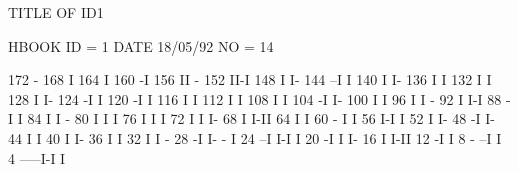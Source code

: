 \begin{Listing}
 TITLE OF ID1                                                                    
 
 HBOOK     ID =         1                                        DATE  18/05/92              NO =    14
 
      172                                    -
      168                                    I
      164                                    I
      160                                   -I
      156                                   II -
      152                                   II-I
      148                                   I  I-
      144                                 --I   I
      140                                 I     I-
      136                                 I      I
      132                                 I      I
      128                                 I      I-
      124                                -I       I
      120                               -I        I
      116                               I         I
      112                               I         I
      108                               I         I
      104                              -I         I-
      100                              I           I
       96                              I           I -
       92                              I           I-I
       88                             -I             I
       84                             I              I -
       80                             I              I I
       76                             I              I I
       72                             I              I I-
       68                             I              I-II
       64                             I                 I
       60                           - I                 I
       56                           I-I                 I
       52                           I                   I-
       48                          -I                    I-
       44                          I                      I
       40                          I                      I-
       36                          I                       I
       32                          I                       I    -
       28                         -I                       I- - I
       24                       --I                         I-I I
       20                      -I                             I I-
       16                      I                              I-II
       12                     -I                                 I
        8                 - --I                                  I
        4            -----I-I                                    I
 

\end{Listing}

